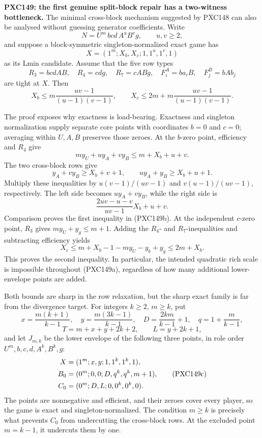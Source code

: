 \documentclass[11pt]{article}
\begin{document}
\medskip
\noindent\textbf{PXC149: the first genuine split-block repair has a
two-witness bottleneck.}
The minimal cross-block mechanism suggested by PXC148 can also be analysed
without guessing generator coefficients.  Write
\[
 N=U^m\,bcd\,A^uB^v g,\qquad u,v\ge2,
\]
and suppose a block-symmetric singleton-normalized exact game has
\[
 X=(1^m;X_b,X_c;1,1^u,1^v,1)
\]
as its Lmin candidate.  Assume that the five row types
\[
 R_3=bcdAB,\quad R_4=cdg,\quad R_7=cABg,
 \quad F_i^A=ba_iB,\quad F_j^B=bAb_j                 \tag{PXC149a}
\]
are tight at \(X\).  Then
\begin{equation}
 X_b\le m\frac{uv-1}{(u-1)(v-1)},\qquad
 X_c\le2m+m\frac{uv-1}{(u-1)(v-1)}.                 \tag{PXC149b}
\end{equation}

The proof exposes why exactness is load-bearing.  Exactness and singleton
normalization supply separate core points with coordinates \(b=0\) and
\(c=0\); averaging within \(U,A,B\) preserves those zeroes.  At the
\(b\)-zero point, efficiency and \(R_4\) give
\[
 m y_U+u y_A+v y_B\le m+X_b+u+v.
\]
The two cross-block rows give
\[
 y_A+v y_B\ge X_b+v+1,\qquad
 u y_A+y_B\ge X_b+u+1.
\]
Multiply these inequalities by
\(u(v-1)/(uv-1)\) and \(v(u-1)/(uv-1)\), respectively.
The left side becomes \(u y_A+v y_B\), while the right side is
\[
 \frac{2uv-u-v}{uv-1}X_b+u+v.
\]
Comparison proves the first inequality in (PXC149b).  At the independent
\(c\)-zero point, \(R_3\) gives \(m y_U+y_g\le m+1\).  Adding the
\(R_4\)- and \(R_7\)-inequalities and subtracting efficiency yields
\[
 X_c\le m+X_b-1-m y_U-y_b+y_g\le2m+X_b.
\]
This proves the second inequality.  In particular, the intended quadratic
rich scale is impossible throughout (PXC149a), regardless of how many
additional lower-envelope points are added.

Both bounds are sharp in the row relaxation, but the sharp exact family is
far from the divergence target.  For integers \(k\ge2\), \(m\ge k\), put
\[
 x=\frac{m(k+1)}{k-1},\quad y=\frac{m(3k-1)}{k-1},\quad
 D=\frac{2km}{k-1}+1,\quad q=1+\frac{m}{k-1},
\]
\[
 T=m+x+y+2k+2,\qquad L=y+2k+1,
\]
and let \(J_{m,k}\) be the lower envelope of the following three points,
in role order \(U^m,b,c,d,A^k,B^k,g\):
\begin{align}
 X&=(1^m;x,y;1,1^k,1^k,1),\notag\\
 B_0&=(0^m;0,0;D,q^k,q^k,m+1),\tag{PXC149c}\\
 C_0&=(0^m;D,L;0,0^k,0^k,0).\notag
\end{align}
The points are nonnegative and efficient, and their zeroes cover every
player, so the game is exact and singleton-normalized.  The condition
\(m\ge k\) is precisely what prevents \(C_0\) from undercutting the
cross-block rows.  At the excluded point \(m=k-1\), it undercuts them by
one.
\end{document}
